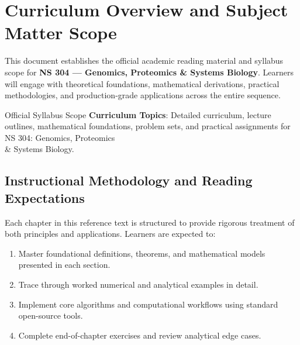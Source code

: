 \section{Curriculum Overview and Subject Matter Scope}

This document establishes the official academic reading material and syllabus scope for \textbf{NS 304 --- Genomics, Proteomics \& Systems Biology}. Learners will engage with theoretical foundations, mathematical derivations, practical methodologies, and production-grade applications across the entire sequence.

\begin{InsightBox}{Official Syllabus Scope}
  \textbf{Curriculum Topics}: Detailed curriculum, lecture outlines, mathematical foundations, problem sets, and practical assignments for NS 304: Genomics, Proteomics \\& Systems Biology.
\end{InsightBox}

\subsection{Instructional Methodology and Reading Expectations}

Each chapter in this reference text is structured to provide rigorous treatment of both principles and applications. Learners are expected to:
\begin{enumerate}
  \item Master foundational definitions, theorems, and mathematical models presented in each section.
  \item Trace through worked numerical and analytical examples in detail.
  \item Implement core algorithms and computational workflows using standard open-source tools.
  \item Complete end-of-chapter exercises and review analytical edge cases.
\end{enumerate}

